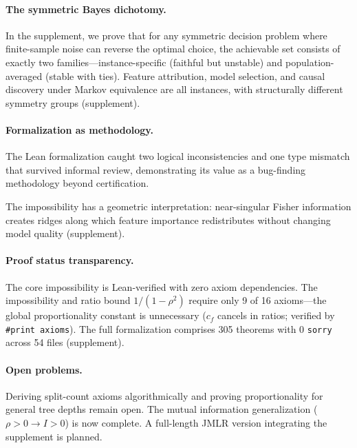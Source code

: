 \documentclass{article}
\begin{document}
\paragraph{The symmetric Bayes dichotomy.}
In the supplement, we prove that for any symmetric decision problem where finite-sample noise can reverse the optimal choice, the achievable set consists of exactly two families---instance-specific (faithful but unstable) and population-averaged (stable with ties).
Feature attribution, model selection, and causal discovery under Markov equivalence are all instances, with structurally different symmetry groups (supplement).

\paragraph{Formalization as methodology.}
The Lean formalization caught two logical inconsistencies and one type mismatch that survived informal review, demonstrating its value as a bug-finding methodology beyond certification.

The impossibility has a geometric interpretation: near-singular Fisher information creates ridges along which feature importance redistributes without changing model quality (supplement).


\paragraph{Proof status transparency.}
The core impossibility is Lean-verified with zero axiom dependencies. The impossibility and ratio bound $1/(1{-}\rho^2)$ require only 9 of 16 axioms---the global proportionality constant is unnecessary ($c_f$ cancels in ratios; verified by \texttt{\#print axioms}). The full formalization comprises 305 theorems with 0 \texttt{sorry} across 54 files (supplement).

\paragraph{Open problems.}
Deriving split-count axioms algorithmically and proving proportionality for general tree depths remain open. The mutual information generalization ($\rho > 0 \to I > 0$) is now complete.
A full-length JMLR version integrating the supplement is planned.
\end{document}
